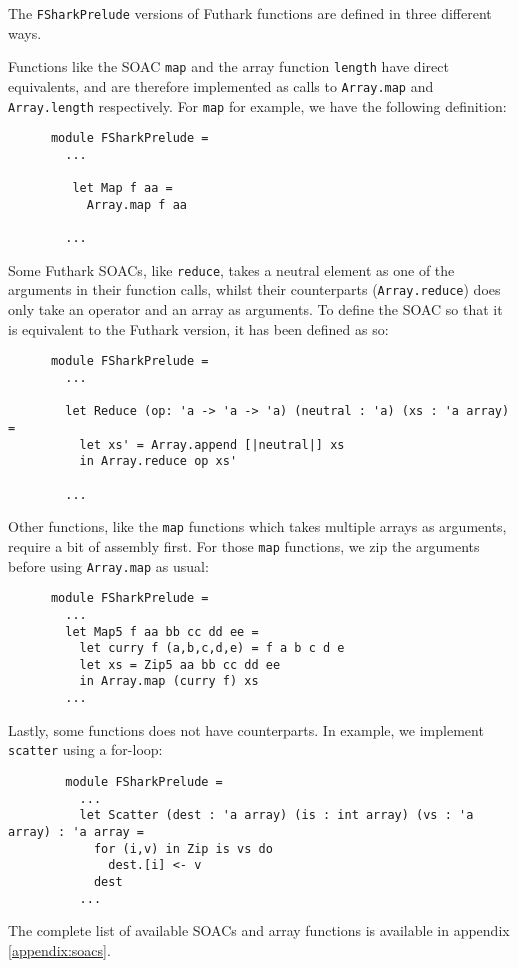 The \texttt{FSharkPrelude} versions of Futhark functions are defined in three
different ways.
\begin{description}
  \item Functions like the SOAC \texttt{map} and the array function
    \texttt{length} have direct \fsharp{} equivalents, and are therefore
    implemented as calls to \texttt{Array.map} and \texttt{Array.length}
    respectively.
    For \texttt{map} for example, we have the following definition:
    \begin{verbatim}
      module FSharkPrelude =
        ...

         let Map f aa =
           Array.map f aa

        ...
    \end{verbatim}

  \item Some Futhark SOACs, like \texttt{reduce}, takes a neutral element as one of the
    arguments in their function calls, whilst their \fsharp{} counterparts
    (\texttt{Array.reduce}) does only take an operator and an array as
    arguments.
    To define the \fshark{} SOAC so that it is equivalent to the Futhark
    version, it has been defined as so:
\begin{verbatim}
      module FSharkPrelude =
        ...
      
        let Reduce (op: 'a -> 'a -> 'a) (neutral : 'a) (xs : 'a array) =
          let xs' = Array.append [|neutral|] xs
          in Array.reduce op xs'

        ...
    \end{verbatim}
    Other functions, like the \texttt{map} functions which takes multiple arrays as
    arguments, require a bit of assembly first. For those \texttt{map} functions,
    we zip the arguments before using \texttt{Array.map} as usual:
\begin{verbatim}
      module FSharkPrelude =
        ...
        let Map5 f aa bb cc dd ee =
          let curry f (a,b,c,d,e) = f a b c d e
          let xs = Zip5 aa bb cc dd ee
          in Array.map (curry f) xs
        ...
    \end{verbatim}

    \item Lastly, some functions does not have \fsharp{} counterparts. In
      example, we implement \texttt{scatter} using a for-loop:
\begin{verbatim}
        module FSharkPrelude =
          ...
          let Scatter (dest : 'a array) (is : int array) (vs : 'a array) : 'a array =
            for (i,v) in Zip is vs do
              dest.[i] <- v
            dest
          ...
      \end{verbatim}
\end{description}
The complete list of available SOACs and array functions is available in
appendix \ref{appendix:soacs}.

